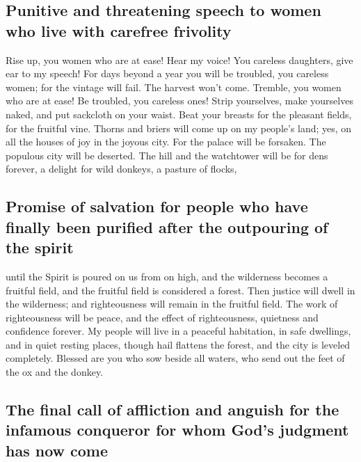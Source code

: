 \hypertarget{punitive-and-threatening-speech-to-women-who-live-with-carefree-frivolity}{%
\subsection{Punitive and threatening speech to women who live with
carefree
frivolity}\label{punitive-and-threatening-speech-to-women-who-live-with-carefree-frivolity}}

 Rise up, you women who are at ease! Hear my voice! You
careless daughters, give ear to my speech!  For days
beyond a year you will be troubled, you careless women; for the vintage
will fail. The harvest won't come.  Tremble, you women
who are at ease! Be troubled, you careless ones! Strip yourselves, make
yourselves naked, and put sackcloth on your waist.  Beat
your breasts for the pleasant fields, for the fruitful vine.
 Thorns and briers will come up on my people's land; yes,
on all the houses of joy in the joyous city.  For the
palace will be forsaken. The populous city will be deserted. The hill
and the watchtower will be for dens forever, a delight for wild donkeys,
a pasture of flocks,

\hypertarget{promise-of-salvation-for-people-who-have-finally-been-purified-after-the-outpouring-of-the-spirit}{%
\subsection{Promise of salvation for people who have finally been
purified after the outpouring of the
spirit}\label{promise-of-salvation-for-people-who-have-finally-been-purified-after-the-outpouring-of-the-spirit}}

 until the Spirit is poured on us from on high, and the
wilderness becomes a fruitful field, and the fruitful field is
considered a forest.  Then justice will dwell in the
wilderness; and righteousness will remain in the fruitful field.
 The work of righteousness will be peace, and the effect
of righteousness, quietness and confidence forever.  My
people will live in a peaceful habitation, in safe dwellings, and in
quiet resting places,  though hail flattens the forest,
and the city is leveled completely.  Blessed are you who
sow beside all waters, who send out the feet of the ox and the donkey.

\hypertarget{the-final-call-of-affliction-and-anguish-for-the-infamous-conqueror-for-whom-gods-judgment-has-now-come}{%
\subsection{The final call of affliction and anguish for the infamous
conqueror for whom God's judgment has now
come}\label{the-final-call-of-affliction-and-anguish-for-the-infamous-conqueror-for-whom-gods-judgment-has-now-come}}

